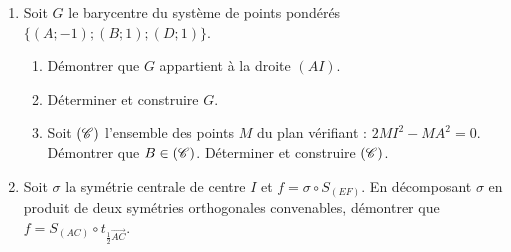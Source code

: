             \begin{enumerate}
                  \item Soit $G$ le barycentre du syst\`eme de points pond\'er\'es
                        $\{ (A;-1);(B;1);(D;1) \}$.
                        \begin{enumerate}
                              \item D\'emontrer que $G$ appartient \`a la droite $(AI)$.
                              \item D\'eterminer et construire $G$.
                              \item Soit $(\mathscr{C})$ l'ensemble des points $M$ du plan v\'erifiant : 
                                    $2 MI^2 - MA^2 = 0$.
                                    D\'emontrer que $B \in (\mathscr{C})$.
                                    D\'eterminer et construire $(\mathscr{C})$.
                        \end{enumerate}
                  \item Soit $\sigma$ la sym\'etrie centrale de centre $I$ et $f = \sigma \circ S_{(EF)}$.
                        En d\'ecomposant $\sigma$ en produit de deux sym\'etries orthogonales convenables,
                        d\'emontrer que $f = S_{(AC)} \circ t_{\frac{1}{2}\overrightarrow{AC}}$.
            \end{enumerate}

